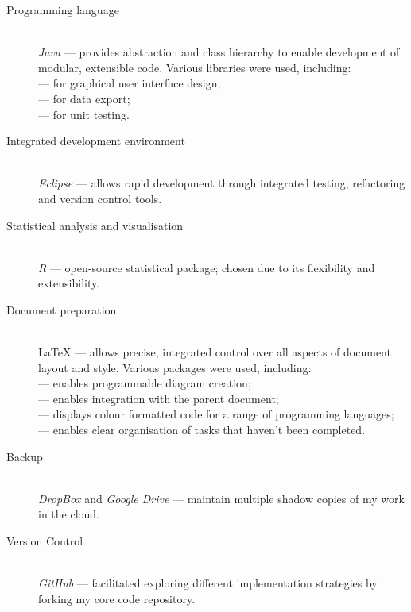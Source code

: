 \documentclass[12pt,notitlepage]{report}
\begin{document}
\begin{description}
  \item[Programming language] \hfill \\
  {\em Java} --- provides abstraction and class hierarchy to enable development of modular, extensible code. Various libraries were used, including:\\
  \hphantom{} \hspace{6 mm}{\em Swing} --- for graphical user interface design;\\ 
  \hphantom{} \hspace{6 mm}{\em CSVWriter} --- for data export;\\
  \hphantom{} \hspace{6 mm}{\em JUnit} --- for unit testing.
  \item[Integrated development environment] \hfill \\
  {\em Eclipse} --- allows rapid development through integrated testing, refactoring and version control tools.
  \item[Statistical analysis and visualisation] \hfill \\
  {\em R} --- open-source statistical package; chosen due to its flexibility and extensibility.
  \item[Document preparation] \hfill \\
  {\LaTeX} --- allows precise, integrated control over all aspects of document layout and style. Various packages were used, including:\\
  \hphantom{} \hspace{6 mm}{\em Tikz} --- enables programmable diagram creation;\\
  \hphantom{} \hspace{6 mm}{\em algorithm2e} --- enables integration with the parent document;\\
  \hphantom{} \hspace{6 mm}{\em listings} --- displays colour formatted code for a range of programming languages;\\
  \hphantom{} \hspace{6 mm}{\em todonotes} --- enables clear organisation of tasks that haven't been completed.
  \item[Backup] \hfill \\
  {\em DropBox} and {\em Google Drive} --- maintain multiple shadow copies of my work in the cloud.
  \item[Version Control]\hfill \\
  {\em GitHub} --- facilitated exploring different implementation strategies by forking my core code repository.
  
\end{description}
\end{document}
